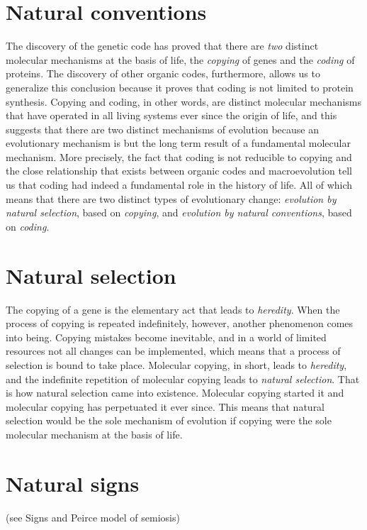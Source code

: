 \documentclass[12pt]{article}
\begin{document}
\section{Natural conventions}
The discovery of the genetic code has proved that there are \textit{two} distinct molecular mechanisms at the basis of life, the \textit{copying} of genes and the \textit{coding} of proteins. The discovery of other organic codes, furthermore, allows us to generalize this conclusion because it proves that coding is not limited to protein synthesis. Copying and coding, in other words, are distinct molecular mechanisms that have operated in all living systems ever since the origin of life, and this suggests that there are two distinct mechanisms of evolution because an evolutionary mechanism is but the long term result of a fundamental molecular mechanism. More precisely, the fact that coding is not reducible to copying and the close relationship that exists between organic codes and macroevolution tell us that coding had indeed a fundamental role in the history of life. All of which means that there are two distinct types of evolutionary change: \textit{evolution by natural selection}, based on \textit{copying}, and \textit{evolution by natural conventions}, based on \textit{coding}.
 

\section{Natural selection}
The copying of a gene is the elementary act that leads to \textit{heredity}. When the process of copying is repeated indefinitely, however, another phenomenon comes into being. Copying mistakes become inevitable, and in a world of limited resources not all changes can be implemented, which means that a process of selection is bound to take place. Molecular copying, in short, leads to \textit{heredity}, and the indefinite repetition of molecular copying leads to \textit{natural selection}. That is how natural selection came into existence. Molecular copying started it and molecular copying has perpetuated it ever since. This means that natural selection would be the sole mechanism of evolution if copying were the sole molecular mechanism at the basis of life. 


\section{Natural signs} (see Signs and Peirce model of semiosis) 
\end{document}
